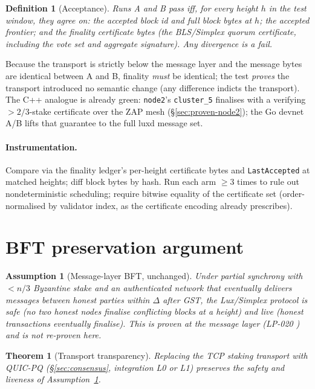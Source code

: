 \documentclass[11pt,a4paper]{article}
\newcommand{\code}[1]{\texttt{#1}}
\newtheorem{theorem}{Theorem}
\newtheorem{definition}{Definition}
\newtheorem{assumption}{Assumption}
\begin{document}
\begin{definition}[Acceptance]\label{def:accept}
Runs A and B \emph{pass} iff, for every height $h$ in the test window,
they agree on: the accepted block id and full block bytes at $h$; the
accepted frontier; and the finality certificate bytes (the BLS/Simplex
quorum certificate, including the vote set and aggregate signature). Any
divergence is a fail.
\end{definition}

Because the transport is strictly below the message layer and the
message bytes are identical between A and B, finality \emph{must} be
identical; the test \emph{proves} the transport introduced no semantic
change (any difference indicts the transport). The C++ analogue is
already green: \code{node2}'s \code{cluster\_5} finalises with a
verifying $>2/3$-stake certificate over the ZAP mesh
(\S\ref{sec:proven-node2}); the Go devnet A/B lifts that guarantee to
the full luxd message set.

\paragraph{Instrumentation.} Compare via the finality ledger's
per-height certificate bytes and \code{LastAccepted} at matched heights;
diff block bytes by hash. Run each arm $\ge 3$ times to rule out
nondeterministic scheduling; require bitwise equality of the certificate
set (order-normalised by validator index, as the certificate encoding
already prescribes).

\section{BFT preservation argument}\label{sec:bft}

\begin{assumption}[Message-layer BFT, unchanged]\label{as:bft}
Under partial synchrony \cite{dwork1988consensus} with $<n/3$ Byzantine
stake and an \emph{authenticated} network that eventually delivers
messages between honest parties within $\Delta$ after GST, the
Lux/Simplex protocol is safe (no two honest nodes finalise
conflicting blocks at a height) and live (honest transactions eventually
finalise). This is proven at the message layer (LP-020
\cite{lp020quasar}) and is \emph{not} re-proven here.
\end{assumption}

\begin{theorem}[Transport transparency]\label{thm:transparent}
Replacing the TCP staking transport with QUIC-PQ (\S\ref{sec:consensus},
integration L0 or L1) preserves the safety and liveness of
Assumption~\ref{as:bft}.
\end{theorem}
\end{document}
